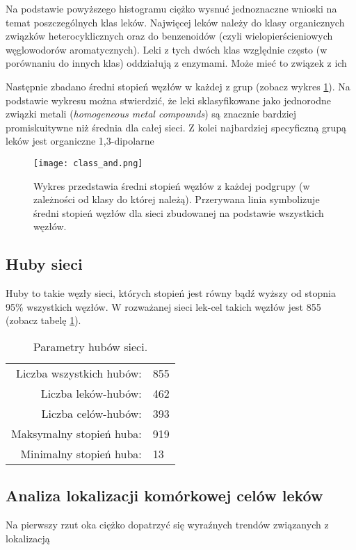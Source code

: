 \documentclass[11pt]{article}
\begin{document}
Na podstawie powyższego histogramu ciężko wysnuć jednoznaczne wnioski na temat poszczególnych klas leków. Najwięcej leków należy do klasy organicznych związków heterocyklicznych oraz do benzenoidów (czyli wielopierścieniowych węglowodorów aromatycznych). Leki z tych dwóch klas względnie często (w porównaniu do innych klas) oddziałują z enzymami. Może mieć to związek z ich

Następnie zbadano średni stopień węzłów w każdej z grup (zobacz wykres \ref{fig:class_and}). Na podstawie wykresu można stwierdzić, że leki sklasyfikowane jako jednorodne związki metali (\textit{homogeneous metal compounds}) są znacznie bardziej promiskuitywne niż średnia dla całej sieci. Z kolei najbardziej specyficzną grupą leków jest organiczne 1,3-dipolarne 

\begin{figure}[h!]
\begin{center}
\texttt{[image: class\_and.png]}
\caption{Wykres przedstawia średni stopień węzłów z każdej podgrupy (w zależności od klasy do której należą). Przerywana linia symbolizuje średni stopień węzłów dla sieci zbudowanej na podstawie wszystkich węzłów.}
\label{fig:class_and}
\end{center}
\end{figure}

\subsection{Huby sieci}

Huby to takie węzły sieci, których stopień jest równy bądź wyższy od stopnia 95\% wszystkich węzłów. W rozważanej sieci lek-cel takich węzłów jest 855 (zobacz tabelę \ref{t:hubs}).
\begin{table}[h]
\begin{center}
\caption{Parametry hubów sieci.}
\label{t:hubs}
\begin{tabular}{rl}

	Liczba wszystkich hubów: & 855\\
	Liczba leków-hubów: & 462\\
	Liczba celów-hubów: & 393\\
	Maksymalny stopień huba: & 919\\
	Minimalny stopień huba: & 13\\
	

\end{tabular}
\end{center}
\end{table}



\subsection{Analiza lokalizacji komórkowej celów leków}

Na pierwszy rzut oka ciężko dopatrzyć się wyraźnych trendów związanych z lokalizacją
\end{document}
